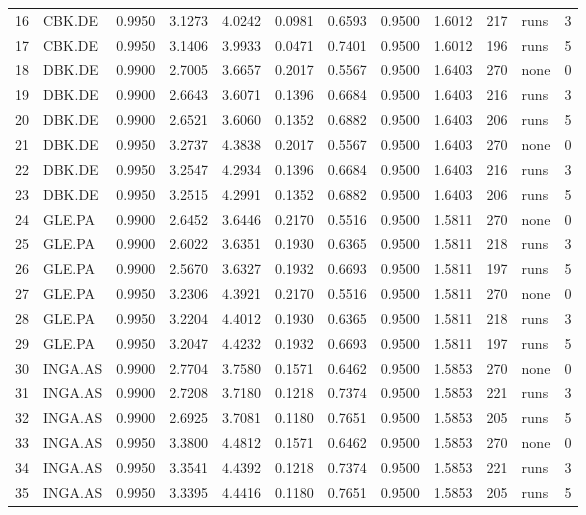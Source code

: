\begin{table}
\begin{tabular}{llrrrrrrrrlr}
16 & CBK.DE & 0.9950 & 3.1273 & 4.0242 & 0.0981 & 0.6593 & 0.9500 & 1.6012 & 217 & runs & 3 \\
17 & CBK.DE & 0.9950 & 3.1406 & 3.9933 & 0.0471 & 0.7401 & 0.9500 & 1.6012 & 196 & runs & 5 \\
18 & DBK.DE & 0.9900 & 2.7005 & 3.6657 & 0.2017 & 0.5567 & 0.9500 & 1.6403 & 270 & none & 0 \\
19 & DBK.DE & 0.9900 & 2.6643 & 3.6071 & 0.1396 & 0.6684 & 0.9500 & 1.6403 & 216 & runs & 3 \\
20 & DBK.DE & 0.9900 & 2.6521 & 3.6060 & 0.1352 & 0.6882 & 0.9500 & 1.6403 & 206 & runs & 5 \\
21 & DBK.DE & 0.9950 & 3.2737 & 4.3838 & 0.2017 & 0.5567 & 0.9500 & 1.6403 & 270 & none & 0 \\
22 & DBK.DE & 0.9950 & 3.2547 & 4.2934 & 0.1396 & 0.6684 & 0.9500 & 1.6403 & 216 & runs & 3 \\
23 & DBK.DE & 0.9950 & 3.2515 & 4.2991 & 0.1352 & 0.6882 & 0.9500 & 1.6403 & 206 & runs & 5 \\
24 & GLE.PA & 0.9900 & 2.6452 & 3.6446 & 0.2170 & 0.5516 & 0.9500 & 1.5811 & 270 & none & 0 \\
25 & GLE.PA & 0.9900 & 2.6022 & 3.6351 & 0.1930 & 0.6365 & 0.9500 & 1.5811 & 218 & runs & 3 \\
26 & GLE.PA & 0.9900 & 2.5670 & 3.6327 & 0.1932 & 0.6693 & 0.9500 & 1.5811 & 197 & runs & 5 \\
27 & GLE.PA & 0.9950 & 3.2306 & 4.3921 & 0.2170 & 0.5516 & 0.9500 & 1.5811 & 270 & none & 0 \\
28 & GLE.PA & 0.9950 & 3.2204 & 4.4012 & 0.1930 & 0.6365 & 0.9500 & 1.5811 & 218 & runs & 3 \\
29 & GLE.PA & 0.9950 & 3.2047 & 4.4232 & 0.1932 & 0.6693 & 0.9500 & 1.5811 & 197 & runs & 5 \\
30 & INGA.AS & 0.9900 & 2.7704 & 3.7580 & 0.1571 & 0.6462 & 0.9500 & 1.5853 & 270 & none & 0 \\
31 & INGA.AS & 0.9900 & 2.7208 & 3.7180 & 0.1218 & 0.7374 & 0.9500 & 1.5853 & 221 & runs & 3 \\
32 & INGA.AS & 0.9900 & 2.6925 & 3.7081 & 0.1180 & 0.7651 & 0.9500 & 1.5853 & 205 & runs & 5 \\
33 & INGA.AS & 0.9950 & 3.3800 & 4.4812 & 0.1571 & 0.6462 & 0.9500 & 1.5853 & 270 & none & 0 \\
34 & INGA.AS & 0.9950 & 3.3541 & 4.4392 & 0.1218 & 0.7374 & 0.9500 & 1.5853 & 221 & runs & 3 \\
35 & INGA.AS & 0.9950 & 3.3395 & 4.4416 & 0.1180 & 0.7651 & 0.9500 & 1.5853 & 205 & runs & 5 \\

\end{tabular}
\end{table}
